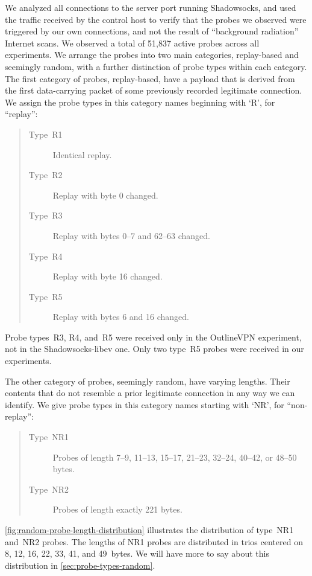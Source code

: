 \documentclass[sigconf,letterpaper]{acmart}
\begin{document}
We analyzed all connections to the server port running Shadowsocks,
and used the traffic received by the control host to verify that the probes we observed
were triggered by our own connections,
and not the result of ``background radiation'' Internet scans.
We observed a total of 51,837 active probes across all experiments.
We arrange the probes into two main categories,
replay-based and seemingly random,
with a further distinction of probe types within each category.
The first category of probes, replay-based,
have a payload that is derived from the first data-carrying packet
of some previously recorded legitimate connection.
We assign the probe types in this category names beginning with `R', for ``replay'':
\begin{quote}
\begin{description}
\item[Type~R1] Identical replay.
\item[Type~R2] Replay with byte 0 changed.
\item[Type~R3] Replay with bytes 0--7 and 62--63 changed.
\item[Type~R4] Replay with byte 16 changed.
\item[Type~R5] Replay with bytes 6 and 16 changed.
\end{description}
\end{quote}

Probe types~R3, R4, and~R5 were received only in the OutlineVPN experiment,
not in the Shadowsocks-libev one.
Only two type~R5 probes were received in our experiments.

The other category of probes, seemingly random, have varying lengths.
Their contents that do not resemble a prior legitimate connection in any way we can identify.
We give probe types in this category names starting with `NR', for ``non-replay'':
\begin{quote}
\begin{description}
\item[Type~NR1] Probes of length 7--9, 11--13, 15--17, 21--23, 32--24, 40--42, or 48--50 bytes.
\item[Type~NR2] Probes of length exactly 221 bytes.
\end{description}
\end{quote}

\autoref{fig:random-probe-length-distribution}
illustrates the distribution of type~NR1 and~NR2 probes.
The lengths of NR1 probes are distributed in trios
centered on 8, 12, 16, 22, 33, 41, and 49~bytes.
We will have more to say about this distribution in
\autoref{sec:probe-types-random}.
\end{document}
